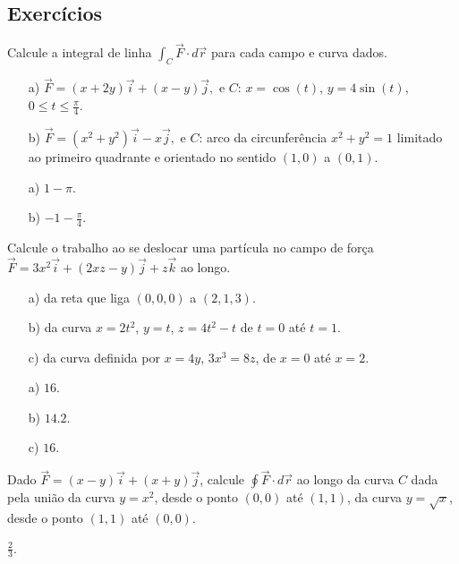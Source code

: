 \subsection*{Exercícios}
\begin{exer}Calcule a integral de linha $\int_C\vec{F}\cdot d\vec{r}$ para cada campo e curva dados.
\begin{itemize}
 \item[a)] $\vec{F}=(x+2y)\vec{i}+(x-y)\vec{j},$ e $C$: $x=\cos(t)$, $y=4\sin(t)$, $0\leq t\leq \frac{\pi}{4}$.
 \item[b)] $\vec{F}=(x^2+y^2)\vec{i}-x\vec{j},$ e $C$: arco da circunferência $x^2+y^2=1$ limitado ao primeiro quadrante e orientado no sentido $(1,0)$ a $(0,1)$.
 \end{itemize}
\end{exer}
\begin{resp}
 \begin{itemize}
  \item[a)] $1-\pi$.
  \item[b)] $-1-\frac{\pi}{4}$.
 \end{itemize}
\end{resp}
\begin{exer}
 Calcule o trabalho ao se deslocar uma partícula no campo de força $\vec{F}=3x^2\vec{i}+(2xz-y)\vec{j}+z\vec{k}$ ao longo.
 \begin{itemize}
  \item[a)] da reta que liga $(0,0,0)$ a $(2,1,3)$. 
  \item[b)] da curva $x=2t^2$, $y=t$, $z=4t^2-t$ de $t=0$ até $t=1$.
  \item[c)] da curva definida por $x=4y$, $3x^3=8z$, de $x=0$ até $x=2$.
 \end{itemize}
 \end{exer}
\begin{resp}
 \begin{itemize}
  \item[a)] $16$.
  \item[b)] $14.2$.
  \item[c)] $16$.
 \end{itemize}
\end{resp}
\begin{exer}
 Dado $\vec{F}=(x-y)\vec{i}+(x+y)\vec{j}$, calcule $\oint\vec{F}\cdot d\vec{r}$ ao longo da curva $C$ dada pela união da curva $y=x^2$, desde o ponto $(0,0)$ até $(1,1)$, da curva $y=\sqrt{x}$, desde o ponto $(1,1)$ até $(0,0)$.
\end{exer}
\begin{resp}
 $\frac{2}{3}$.
\end{resp}






